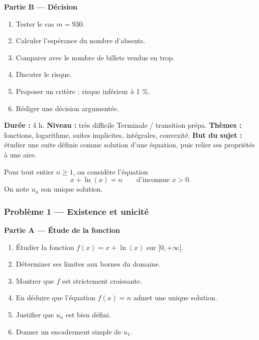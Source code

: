 \documentclass[11pt,a4paper]{article}
\begin{document}
\begin{difficile}
\textbf{Partie B — Décision}
\begin{enumerate}
  \item Tester le cas $m=930$.
  \item Calculer l'espérance du nombre d'absents.
  \item Comparer avec le nombre de billets vendus en trop.
  \item Discuter le risque.
  \item Proposer un critère : risque inférieur à 1 \%.
  \item Rédiger une décision argumentée.
\end{enumerate}
\end{difficile}

\hypertarget{M-EXCELLENCE-05}{}
\begin{difficile}
\textbf{Durée :} 4 h.  
\textbf{Niveau :} très difficile Terminale / transition prépa.  
\textbf{Thèmes :} fonctions, logarithme, suites implicites, intégrales, convexité.  
\textbf{But du sujet :} étudier une suite définie comme solution d'une équation, puis relier ses propriétés à une aire.

\medskip

Pour tout entier $n\geq1$, on considère l'équation
\[
x+\ln(x)=n
\qquad \text{d'inconnue } x>0.
\]
On note $u_n$ son unique solution.

\subsubsection*{Problème 1 — Existence et unicité}

\textbf{Partie A — Étude de la fonction}
\begin{enumerate}
  \item Étudier la fonction $f(x)=x+\ln(x)$ sur $]0,+\infty[$.
  \item Déterminer ses limites aux bornes du domaine.
  \item Montrer que $f$ est strictement croissante.
  \item En déduire que l'équation $f(x)=n$ admet une unique solution.
  \item Justifier que $u_n$ est bien défini.
  \item Donner un encadrement simple de $u_1$.
\end{enumerate}


\end{difficile}
\end{document}
